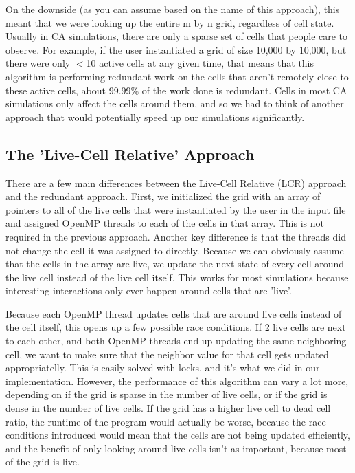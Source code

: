 \documentclass[12pt]{article}
\begin{document}
On the downside (as you can assume based on the name of this approach), this meant that we were looking up the entire m by n grid, regardless of cell state. Usually in CA simulations, there are only a sparse set of cells that people care to observe. For example, if the user instantiated a grid of size 10,000 by 10,000, but there were only $<$10 active cells at any given time, that means that this algorithm is performing redundant work on the cells that aren't remotely close to these active cells, about 99.99\% of the work done is redundant. Cells in most CA simulations only affect the cells around them, and so we had to think of another approach that would potentially speed up our simulations significantly.

\subsection{The 'Live-Cell Relative' Approach}
There are a few main differences between the Live-Cell Relative (LCR) approach and the redundant approach. First, we initialized the grid with an array of pointers to all of the live cells that were instantiated by the user in the input file and assigned OpenMP threads to each of the cells in that array. This is not required in the previous approach. Another key difference is that the threads did not change the cell it was assigned to directly. Because we can obviously assume that the cells in the array are live, we update the next state of every cell around the live cell instead of the live cell itself. This works for most simulations because interesting interactions only ever happen around cells that are 'live'.

Because each OpenMP thread updates cells that are around live cells instead of the cell itself, this opens up a few possible race conditions. If 2 live cells are next to each other, and both OpenMP threads end up updating the same neighboring cell, we want to make sure that the neighbor value for that cell gets updated appropriatelly. This is easily solved with locks, and it's what we did in our implementation. However, the performance of this algorithm can vary a lot more, depending on if the grid is sparse in the number of live cells, or if the grid is dense in the number of live cells. If the grid has a higher live cell to dead cell ratio, the runtime of the program would actually be worse, because the race conditions introduced would mean that the cells are not being updated efficiently, and the benefit of only looking around live cells isn't as important, because most of the grid is live.
\end{document}
